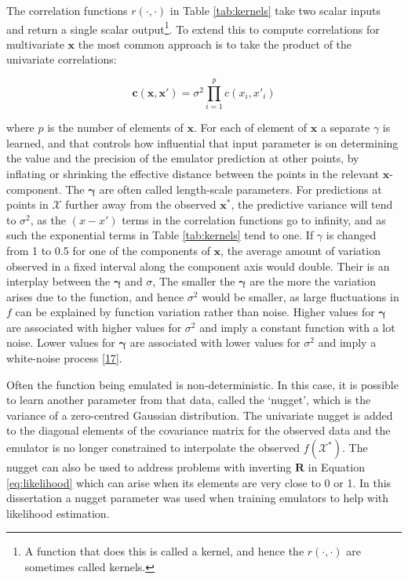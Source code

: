 \documentclass[
  12pt,
  a4paper,
  twoside]{book}
\begin{document}
The correlation functions \(r(\cdot, \cdot)\) in Table \ref{tab:kernels} take two scalar inputs and return a single scalar output\footnote{A function that does this is called a kernel, and hence the \(r(\cdot, \cdot)\) are sometimes called kernels.}. To extend this to compute correlations for multivariate \(\mathbf{x}\) the most common approach is to take the product of the univariate correlations:

\begin{equation}
\label{eq:mv-correlation}
\mathbf{c}(\mathbf{\mathbf{x}, \mathbf{x'}}) = \sigma^2 \prod_{i=1}^p c(x_i, x'_i)
\end{equation}

where \(p\) is the number of elements of \(\mathbf{x}\). For each of element of \(\mathbf{x}\) a separate \(\gamma\) is learned, and that controls how influential that input parameter is on determining the value and the precision of the emulator prediction at other points, by inflating or shrinking the effective distance between the points in the relevant \(\mathbf{x}\)-component. The \(\mathbf{\gamma}\) are often called length-scale parameters. For predictions at points in \(\mathcal{X}\) further away from the observed \(\mathbf{x^*}\), the predictive variance will tend to \(\sigma^2\), as the \((x-x')\) terms in the correlation functions go to infinity, and as such the exponential terms in Table \ref{tab:kernels} tend to one. If \(\gamma\) is changed from 1 to 0.5 for one of the components of \(\mathbf{x}\), the average amount of variation observed in a fixed interval along the component axis would double. Their is an interplay between the \(\mathbf{\gamma}\) and \(\sigma\), The smaller the \(\mathbf{\gamma}\) are the more the variation arises due to the function, and hence \(\sigma^2\) would be smaller, as large fluctuations in \(f\) can be explained by function variation rather than noise. Higher values for \(\mathbf{\gamma}\) are associated with higher values for \(\sigma^2\) and imply a constant function with a lot noise. Lower values for \(\mathbf{\gamma}\) are associated with lower values for \(\sigma^2\) and imply a white-noise process \protect\hyperlink{ref-gp4ml}{{[}17{]}}.

Often the function being emulated is non-deterministic. In this case, it is possible to learn another parameter from that data, called the `nugget', which is the variance of a zero-centred Gaussian distribution. The univariate nugget is added to the diagonal elements of the covariance matrix for the observed data and the emulator is no longer constrained to interpolate the observed \(f(\mathcal{X^*})\). The nugget can also be used to address problems with inverting \(\mathbf{R}\) in Equation \eqref{eq:likelihood} which can arise when its elements are very close to 0 or 1. In this dissertation a nugget parameter was used when training emulators to help with likelihood estimation.
\end{document}
